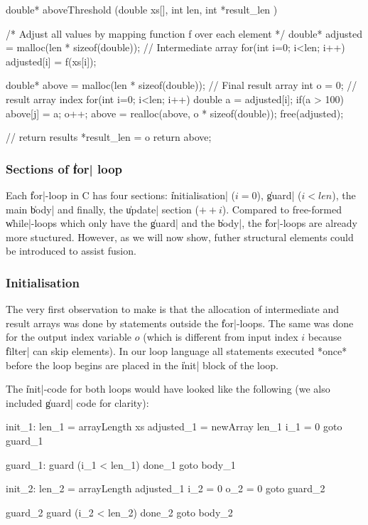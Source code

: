 \documentclass[preamble.tex]{subfiles}
\begin{document}
\begin{ccode} 
double* aboveThreshold (double xs[], int len, int *result_len ) {

  /* Adjust all values by mapping function f over each element */
  double* adjusted = malloc(len * sizeof(double)); // Intermediate array
  for(int i=0; i<len; i++) {
      adjusted[i] = f(xs[i]);
  }

  double* above = malloc(len * sizeof(double));     // Final result array
  int o = 0; // result array index
  for(int i=0; i<len; i++) {
      double a = adjusted[i];
      if(a > 100) {
          above[j] = a;
          o++;
      }
  }
  above = realloc(above, o * sizeof(double));
  free(adjusted);

  // return results
  *result_len = o
  return above;
}
\end{ccode}


\subsubsection{Sections of \|for| loop}
Each \|for|-loop in C has four sections: \|initialisation| ($i=0$), \|guard| ($i<len$), the main \|body| and finally, the \|update| section ($++i$). Compared to free-formed \|while|-loops which only have the \|guard| and the \|body|, the \|for|-loops are already more stuctured. However, as we will now show, futher structural elements could be introduced to assist fusion.

\subsubsection{Initialisation}
The very first observation to make is that the allocation of intermediate and result arrays was done by statements outside the \|for|-loops. The same was done for the output index variable $o$ (which is different from input index $i$ because \|filter| can skip elements). In our loop language all statements executed *once* before the loop begins are placed in the \|init| block of the loop.

The \|init|-code for both loops would have looked like the following (we also included \|guard| code for clarity):

\begin{loopcode}
  init_1:
    len_1 = arrayLength xs
    adjusted_1 = newArray len_1
    i_1 = 0
    goto guard_1

  guard_1:
    guard (i_1 < len_1) done_1
    goto body_1

  init_2:
    len_2 = arrayLength adjusted_1
    i_2 = 0
    o_2 = 0
    goto guard_2

  guard_2
    guard (i_2 < len_2) done_2
    goto body_2
\end{loopcode}
\end{document}

